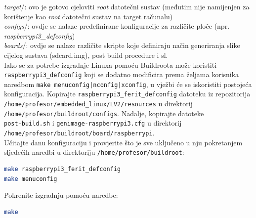 \documentclass[11pt]{article}
\begin{document}
\newline
\textit{target}/: ovo je gotovo cjeloviti \textit{root} datotečni sustav
 (međutim nije namijenjen za korištenje kao \textit{root} datotečni sustav na
 target računalu)\\
\newline
\textit{configs}/: ovdje se nalaze predefinirane konfiguracije za različite
 ploče (npr. \textit{raspberrypi3\_defconfig})\\
\newline
\textit{boards}/: ovdje se nalaze različite skripte koje definiraju način
 generiranja slike cijelog sustava (sdcard.img), post build procedure i sl.\\
\newline
Iako se za potrebe izgradnje Linuxa pomoću Buildroota može koristiti\\
 \texttt{raspberrypi3\_defconfig} koji se dodatno modificira prema željama
 korisnika naredbom \texttt{make menuconfig|nconfig|xconfig}, u vježbi će se
 iskoristiti postojeća konfiguracija. Kopirajte
 \texttt{raspberrypi3\_ferit\_defconfig} datoteku iz repozitorija
 \texttt{/home/profesor/embedded\_linux/LV2/resources} u direktorij
 \texttt{/home/profesor/buildroot/configs}. Nadalje, kopirajte datoteke\\
 \texttt{post-build.sh} i \texttt{genimage-raspberrypi3.cfg} u direktorij\\
 \texttt{/home/profesor/buildroot/board/raspberrypi}.\\
\newline
Učitajte danu konfiguraciju i
 provjerite što je sve uključeno u nju pokretanjem sljedećih naredbi u
 direktoriju \texttt{/home/profesor/buildroot}:
\begin{lstlisting}[language=bash]
make raspberrypi3_ferit_defconfig
make menuconfig
\end{lstlisting}
Pokrenite izgradnju pomoću naredbe:
\begin{lstlisting}[language=bash]
make
\end{lstlisting}
\end{document}
